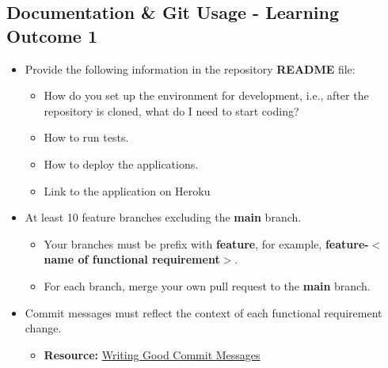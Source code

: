\documentclass{article}
\begin{document}
\subsection*{Documentation \& Git Usage - Learning Outcome 1}
\begin{itemize}
    \item Provide the following information in the repository \textbf{README} file:
    \begin{itemize}
		\item How do you set up the environment for development, i.e., after the repository is cloned, what do I need to start coding?
		\item How to run tests.
		\item How to deploy the applications.
		\item Link to the application on Heroku
    \end{itemize}
    \item At least 10 feature branches excluding the \textbf{main} branch.
    \begin{itemize}
        \item Your branches must be prefix with \textbf{feature}, for example, \textbf{feature-$<$name of functional requirement$>$}.
        \item For each branch, merge your own pull request to the \textbf{main} branch.
    \end{itemize}
    \item Commit messages must reflect the context of each functional requirement change.
    \begin{itemize}
		\item \textbf{Resource:} \href{https://www.freecodecamp.org/news/writing-good-commit-messages-a-practical-guide}{Writing Good Commit Messages}
	\end{itemize}
\end{itemize}
\end{document}
